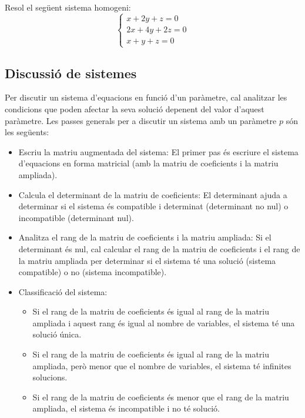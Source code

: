 \documentclass[12pt]{article}
\begin{document}
\begin{exercici}
Resol el següent sistema homogeni:
\[
\begin{cases}
x + 2y + z = 0 \\
2x + 4y + 2z = 0 \\
x + y + z = 0
\end{cases}
\]
\end{exercici}

\subsection{Discussió de sistemes}

\begin{concept}
        Per discutir un sistema d'equacions en funció d'un paràmetre, cal analitzar les condicions que poden afectar la seva solució depenent del valor d'aquest paràmetre. Les passes generals per a discutir un sistema amb un paràmetre \( p \) són les següents:

    \begin{itemize}
        \item Escriu la matriu augmentada del sistema: El primer pas és escriure el sistema d'equacions en forma matricial (amb la matriu de coeficients i la matriu ampliada).
        \item Calcula el determinant de la matriu de coeficients: El determinant ajuda a determinar si el sistema és compatible i determinat (determinant no nul) o incompatible (determinant nul).
        \item Analitza el rang de la matriu de coeficients i la matriu ampliada: Si el determinant és nul, cal calcular el rang de la matriu de coeficients i el rang de la matriu ampliada per determinar si el sistema té una solució (sistema compatible) o no (sistema incompatible).
        \item Classificació del sistema:
        \begin{itemize}
            \item Si el rang de la matriu de coeficients és igual al rang de la matriu ampliada i aquest rang és igual al nombre de variables, el sistema té una solució única.
            \item Si el rang de la matriu de coeficients és igual al rang de la matriu ampliada, però menor que el nombre de variables, el sistema té infinites solucions.
            \item Si el rang de la matriu de coeficients és menor que el rang de la matriu ampliada, el sistema és incompatible i no té solució.
        \end{itemize}
    \end{itemize}
\end{concept}
\end{document}
